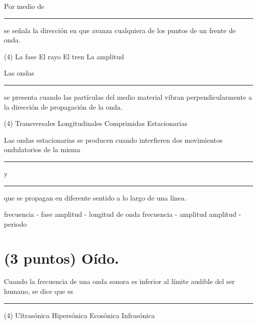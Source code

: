 \documentclass[12pt]{exam}
\begin{document}
\begin{questions}
    \question Por medio de \rule{2cm}{0.1mm} se señala la dirección en que avanza cualquiera de los puntos de un frente de onda.
    \begin{tasks}(4)
        \task La fase
        \task El rayo
        \task El tren
        \task La amplitud
    \end{tasks}
    \question Las ondas \rule{2cm}{0.1mm} se presenta cuando las partículas del medio material vibran perpendicularmente a la dirección de propagación de la onda.
    \begin{tasks}(4)
        \task Transversales
        \task Longitudinales
        \task Comprimidas
        \task Estacionarias
    \end{tasks}
    \question Las ondas estacionarias se producen cuando interfieren dos movimientos ondulatorios de la misma \rule{2cm}{0.1mm} y \rule{2cm}{0.1mm} que se propagan en diferente sentido a lo
    largo de una línea.
    \begin{multicols}{2}
        \begin{tasks}
            \task frecuencia - fase
            \task amplitud - longitud de onda
            \task frecuencia - amplitud
            \task amplitud - periodo
        \end{tasks}
    \end{multicols}

    \section{(3 puntos) Oído.}

    \question Cuando la frecuencia de una onda sonora es inferior al límite audible del ser humano, se dice que es \rule{2cm}{0.1mm}
    \begin{tasks}(4)
        \task Ultrasónica
        \task Hipersónica
        \task Ecosónica
        \task Infrasónica
    \end{tasks}
    

\end{questions}
\end{document}
